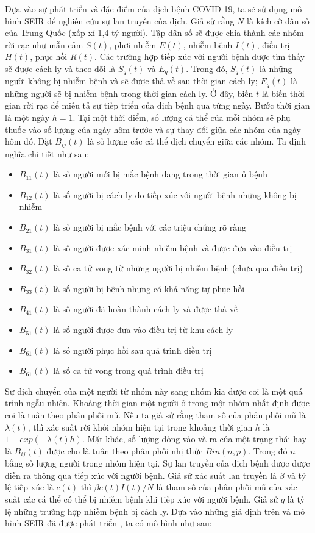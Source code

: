 \documentclass[../main.tex]{subfiles}
\begin{document}
Dựa vào sự phát triển và đặc điểm của dịch bệnh COVID-19, ta sẽ sử dụng mô hình SEIR để nghiên cứu sự lan truyền của dịch. Giả sử rằng $N$ là kích cỡ dân số của Trung Quốc (xấp xỉ 1,4 tỷ người). Tập dân số sẽ được chia thành các nhóm rời rạc như mẫn cảm $S(t)$, phơi nhiễm $E(t)$, nhiễm bệnh $I(t)$, điều trị $H(t)$, phục hồi $R(t)$. Các trường hợp tiếp xúc với người bệnh được tìm thấy sẽ được cách ly và theo dõi là $S_q(t)$ và $E_q(t)$. Trong đó, $S_q(t)$ là những người không bị nhiễm bệnh và sẽ được thả về sau thời gian cách ly; $E_q(t)$ là những người sẽ bị nhiễm bệnh trong thời gian cách ly. Ở đây, biến $t$ là biến thời gian rời rạc để miêu tả sự tiếp triển của dịch bệnh qua từng ngày. Bước thời gian là một ngày $h=1$. Tại một thời điểm, số lượng cá thể của mỗi nhóm sẽ phụ thuốc vào số lượng của ngày hôm trước và sự thay đổi giữa các nhóm của ngày hôm đó. Đặt $B_{ij}(t)$ là số lượng các cá thể dịch chuyển giữa các nhóm. Ta định nghĩa chi tiết như sau:
\begin{itemize}
    \item $B_{11}(t)$ là số người mới bị mắc bệnh đang trong thời gian ủ bệnh
    \item $B_{12}(t)$ là số người bị cách ly do tiếp xúc với người bệnh những không bị nhiễm
    \item $B_{21}(t)$ là số người bị mắc bệnh với các triệu chứng rõ ràng
    \item $B_{31}(t)$ là số người được xác minh nhiễm bệnh và được đưa vào điều trị
    \item $B_{32}(t)$ là số ca tử vong từ những người bị nhiễm bệnh (chưa qua điều trị)
    \item $B_{33}(t)$ là số người bị bệnh nhưng có khả năng tự phục hồi
    \item $B_{41}(t)$ là số người đã hoàn thành cách ly và được thả về
    \item $B_{51}(t)$ là số người được đưa vào điều trị từ khu cách ly
    \item $B_{61}(t)$ là số người phục hồi sau quá trình điều trị
    \item $B_{61}(t)$ là số ca tử vong trong quá trình điều trị
\end{itemize}
Sự dịch chuyển của một người từ nhóm này sang nhóm kia được coi là một quá trình ngẫu nhiên. Khoảng thời gian một người ở trong một nhóm nhất định được coi là tuân theo phân phối mũ. Nếu ta giả sử rằng tham số của phân phối mũ là $\lambda (t)$, thì xác suất rời khỏi nhóm hiện tại trong khoảng thời gian $h$ là $1-exp(-\lambda (t)h)$. Mặt khác, số lượng dòng vào và ra của một trạng thái hay là $B_{ij}(t)$ được cho là tuân theo phân phối nhị thức $Bin(n,p)$. Trong đó $n$ bằng số lượng người trong nhóm hiện tại. Sự lan truyền của dịch bệnh được được diễn ra thông qua tiếp xúc với người bệnh. Giả sử xác suất lan truyền là $\beta$ và tỷ lệ tiếp xúc là $c(t)$ thì $\beta c(t) I(t) / N$ là tham số của phân phối mũ của xác suất các cá thể có thể bị nhiễm bệnh khi tiếp xúc với người bệnh. Giả sử $q$ là tỷ lệ những trường hợp nhiễm bệnh bị cách ly. Dựa vào những giả định trên và mô hình SEIR đã được phát triển \cite{seir}, ta có mô hình như sau:
\end{document}
